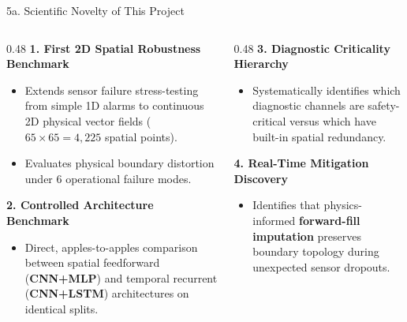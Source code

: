 \documentclass[aspectratio=169, 10pt]{beamer}
\begin{document}
\begin{frame}{5a. Scientific Novelty of This Project}
  \begin{columns}[T]
    \begin{column}{0.48\textwidth}
      \textbf{\color{NavyBlue} 1. First 2D Spatial Robustness Benchmark}
      \begin{itemize}
        \item Extends sensor failure stress-testing from simple 1D alarms to continuous 2D physical vector fields ($65 \times 65 = 4,225$ spatial points).
        \item Evaluates physical boundary distortion under 6 operational failure modes.
      \end{itemize}
      \vspace{4pt}
      \textbf{\color{NavyBlue} 2. Controlled Architecture Benchmark}
      \begin{itemize}
        \item Direct, apples-to-apples comparison between spatial feedforward (\textbf{CNN+MLP}) and temporal recurrent (\textbf{CNN+LSTM}) architectures on identical splits.
      \end{itemize}
    \end{column}

    \begin{column}{0.48\textwidth}
      \textbf{\color{NavyBlue} 3. Diagnostic Criticality Hierarchy}
      \begin{itemize}
        \item Systematically identifies which diagnostic channels are safety-critical versus which have built-in spatial redundancy.
      \end{itemize}
      \vspace{4pt}
      \textbf{\color{NavyBlue} 4. Real-Time Mitigation Discovery}
      \begin{itemize}
        \item Identifies that physics-informed \textbf{forward-fill imputation} preserves boundary topology during unexpected sensor dropouts.
      \end{itemize}
    \end{column}
  \end{columns}
\end{frame}
\end{document}
